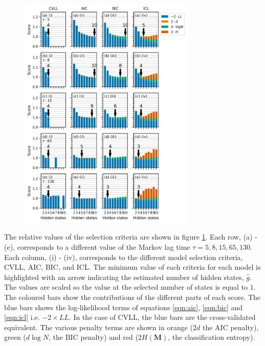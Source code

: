 \begin{figure}
    \centering
    \includegraphics[width=0.75\textwidth]{chapters/hmm_selection/figures/prinz_h_state_selection.png}
    \label{fig:prinz_criteria_results}
\end{figure}

The relative values of the selection criteria are shown in figure \ref{fig:prinz_criteria_results}. Each row, (a) - (e), corresponds to a different value of the Markov lag time $\tau=5, 8, 15, 65, 130$. Each column, (i) - (iv), corresponds to the different model selection criteria, CVLL, AIC, BIC, and ICL. The minimum value of each criteria for each model is highlighted with an arrow indicating the estimated number of hidden states, $\hat{g}$. The values are scaled so the value at the selected number of states is equal to $1$.  The coloured bars show the contributions of the different parts of each score. The blue bars shows the log-likelihood terms of equations \ref{eqn:aic}, \ref{eqn:bic} and \ref{eqn:icl} i.e.  $-2\times LL$. In the case of CVLL, the blue bars are the  cross-validated equivalent. The various penalty terms are shown in orange ($2d$ the AIC penalty), green ($d\log{N}$, the BIC penalty) and red ($2H(\mathbf{M})$, the classification entropy).  

